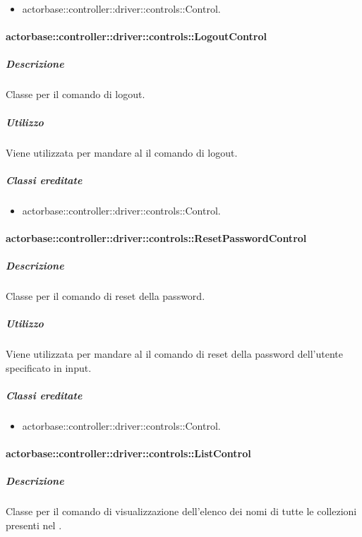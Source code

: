 \documentclass{scalatekids-article}
\begin{document}
\begin{itemize}
\item actorbase::controller::driver::controls::Control.
\end{itemize}

\paragraph{actorbase::controller::driver::controls::LogoutControl}

\subparagraph{Descrizione}

Classe per il comando di logout.

\subparagraph{Utilizzo}

Viene utilizzata per mandare al  il comando di logout.

\subparagraph{Classi ereditate}

\begin{itemize}
\item actorbase::controller::driver::controls::Control.
\end{itemize}

\paragraph{actorbase::controller::driver::controls::ResetPasswordControl}

\subparagraph{Descrizione}

Classe per il comando di reset della password.

\subparagraph{Utilizzo}

Viene utilizzata per mandare al  il comando di reset della password dell'utente specificato in input.

\subparagraph{Classi ereditate}

\begin{itemize}
\item actorbase::controller::driver::controls::Control.
\end{itemize}

\paragraph{actorbase::controller::driver::controls::ListControl}

\subparagraph{Descrizione}

Classe per il comando di visualizzazione dell'elenco dei nomi di tutte le collezioni presenti nel .
\end{document}
